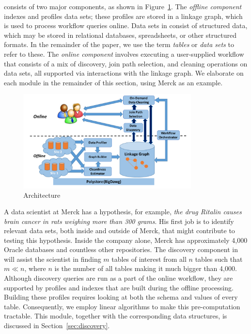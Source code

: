 \dcv consists of two major components, as shown in 
Figure~\ref{fig:arch}.  
The {\it offline component} indexes and profiles data sets;  these profiles are stored  in a linkage graph, which is used to process workflow queries online. 
Data sets in \dcv consist of structured data, which may be stored in relational databases, spreadsheets, or other structured formats. In the remainder of the paper, we use the term {\it tables} or {\it data sets} to refer to these.
The {\it online component} involves executing a user-supplied workflow that consists of a mix of discovery, join path selection, and cleaning operations on data sets, all supported via interactions with the linkage graph. We elaborate on each module in the remainder of this section, using Merck as an example.


\begin{figure}[!t]
\includegraphics[width=3.6in]{arch3.pdf}
\caption{\dcv Architecture}
\label{fig:arch}
\end{figure}


\stitle{[Discovery.]} 
A data scientist at Merck has a hypothesis, for example, {\it the drug Ritalin causes brain cancer in rats weighing more than 300 grams}.
His first job is to identify relevant data sets, both inside and outside of Merck, that might contribute to testing this hypothesis. Inside the company alone, Merck has approximately 4,000 Oracle databases and countless other repositories. The discovery component in \dcv will assist the scientist in finding $m$ tables of interest from all $n$ tables such that $m \ll n$, where $n$ is the number of all tables making it much bigger than 4,000.  
%
Although discovery queries are run as a part of the online workflow, they are supported by profiles and indexes that are built during the offline processing.  Building these profiles requires looking at both the schema and values of every table. 
Consequently, we employ linear algorithms to make this pre-computation tractable.
%
This module, together with the corresponding data structures, is discussed in Section~\ref{sec:discovery}.

